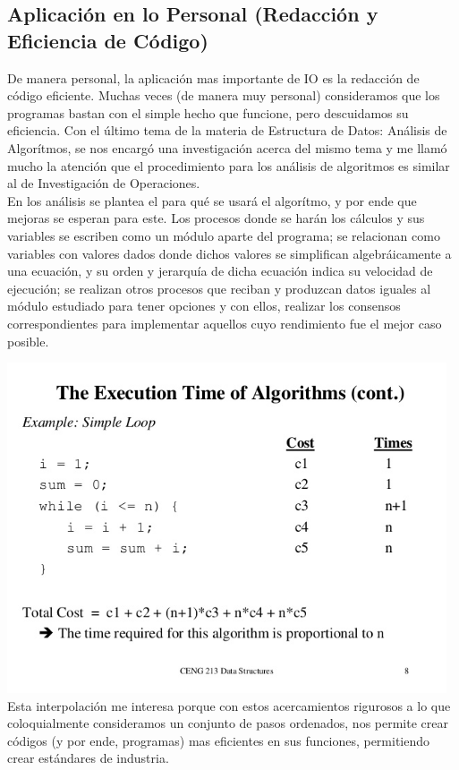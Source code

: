 \documentclass[letterpaper, 12pt]{article}
\begin{document}
\begin{justify}
        \section{Aplicación en lo Personal (Redacción y Eficiencia de Código)}
        \begin{justify}
        De manera personal, la aplicación mas importante de IO es la redacción de código eficiente. Muchas veces (de manera muy personal) consideramos que los programas bastan con el simple hecho que funcione, pero descuidamos su
        eficiencia. Con el último tema de la materia de Estructura de Datos: Análisis de Algorítmos, se nos encargó una investigación acerca del mismo tema y me llamó mucho la atención que el procedimiento para los análisis de algoritmos es similar al de Investigación
        de Operaciones. \\ \newline
        En los análisis se plantea el para qué se usará el algorítmo, y por ende que mejoras se esperan para este. Los procesos donde se harán los cálculos y sus variables se escriben como un módulo aparte del programa; se relacionan como variables con valores dados donde dichos valores
        se simplifican algebráicamente a una ecuación, y su orden y jerarquía de dicha ecuación indica su velocidad de ejecución; se realizan otros procesos que reciban y produzcan datos iguales al módulo estudiado para tener opciones y con ellos, realizar los consensos correspondientes
        para implementar aquellos cuyo rendimiento fue el mejor caso posible.   
        \end{justify}
        \centering
            \includegraphics[width=13cm]{aa.jpg}
        \justify
        Esta interpolación me interesa porque con estos acercamientos rigurosos a lo que coloquialmente consideramos un conjunto de pasos ordenados, nos permite crear códigos (y por ende, programas) mas eficientes en sus funciones, permitiendo crear estándares de industria.

\end{justify}
\end{document}
